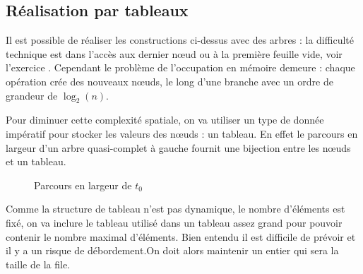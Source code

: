 \subsection{Réalisation par tableaux}
Il est possible de réaliser les constructions ci-dessus avec des arbres : la difficulté technique est dans l'accès aux dernier nœud ou à la première feuille vide, voir l'exercice . Cependant le problème de l'occupation en mémoire demeure : chaque opération crée des nouveaux nœuds, le long d'une branche avec un ordre de grandeur de $\log_2(n)$.

Pour diminuer cette complexité spatiale, on va utiliser un type de donnée impératif pour stocker les valeurs des nœuds : un tableau. En effet le parcours en largeur d'un arbre quasi-complet à gauche fournit une bijection entre les nœuds et un tableau.

\begin{figure*}[ht]
\centering
{}
\caption{Parcours en largeur de $t_0$}
\end{figure*}



Comme la structure de tableau n'est pas dynamique, le nombre d'éléments est fixé, on va inclure le tableau utilisé dans un tableau assez grand pour pouvoir contenir le nombre maximal d'éléments. Bien entendu il est difficile de prévoir et il y a un risque de débordement.On doit alors maintenir un entier qui sera la taille de la file.

\medskip

